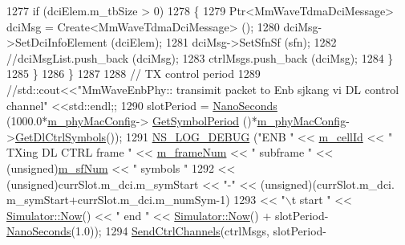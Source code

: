 \begin{DoxyCode}
1277                                 \textcolor{keywordflow}{if} (dciElem.m\_tbSize > 0)
1278                                 \{
1279                                         Ptr<MmWaveTdmaDciMessage> dciMsg = Create<MmWaveTdmaDciMessage> ();
1280                                         dciMsg->SetDciInfoElement (dciElem);
1281                                         dciMsg->SetSfnSf (sfn);
1282                                         \textcolor{comment}{//dciMsgList.push\_back (dciMsg);}
1283                                         ctrlMsgs.push\_back (dciMsg);
1284                                 \}
1285                         \}
1286                 \}
1287 
1288                 \textcolor{comment}{// TX control period}
1289                 \textcolor{comment}{//std::cout<<"MmWaveEnbPhy:: transimit packet to Enb sjkang vi DL control channel"
       <<std::endl;;}
1290                 slotPeriod = \hyperlink{group__timecivil_ga281d64bcb4dad96267d83c7688ec433f}{NanoSeconds} (1000.0*\hyperlink{classns3_1_1MmWavePhy_a869abf36bbdbb94eed77ba6e4846f6e4}{m\_phyMacConfig}->
      \hyperlink{classns3_1_1MmWavePhyMacCommon_a1048fa4a24a72abc5d4d982efd6c21af}{GetSymbolPeriod} ()*\hyperlink{classns3_1_1MmWavePhy_a869abf36bbdbb94eed77ba6e4846f6e4}{m\_phyMacConfig}->\hyperlink{classns3_1_1MmWavePhyMacCommon_a1be2da684374de93d7f501aab2441b5a}{GetDlCtrlSymbols}());
1291                 \hyperlink{group__logging_ga413f1886406d49f59a6a0a89b77b4d0a}{NS\_LOG\_DEBUG} (\textcolor{stringliteral}{"ENB "} << \hyperlink{classns3_1_1MmWavePhy_a0594531da45f93220d4f5de292bae823}{m\_cellId} << \textcolor{stringliteral}{" TXing DL CTRL frame "} << 
      \hyperlink{classns3_1_1MmWavePhy_a852ce585035a1c12122d2775e64ff38a}{m\_frameNum} << \textcolor{stringliteral}{" subframe "} << (\textcolor{keywordtype}{unsigned})\hyperlink{classns3_1_1MmWavePhy_af3d76eb9f3e5e1ff669852d05986c1a3}{m\_sfNum} << \textcolor{stringliteral}{" symbols "}
1292                               << (\textcolor{keywordtype}{unsigned})currSlot.m\_dci.m\_symStart << \textcolor{stringliteral}{"-"} << (\textcolor{keywordtype}{unsigned})(currSlot.m\_dci.
      m\_symStart+currSlot.m\_dci.m\_numSym-1)
1293                               << \textcolor{stringliteral}{"\(\backslash\)t start "} << \hyperlink{classns3_1_1Simulator_ac3178fa975b419f7875e7105be122800}{Simulator::Now}() << \textcolor{stringliteral}{" end "} << 
      \hyperlink{classns3_1_1Simulator_ac3178fa975b419f7875e7105be122800}{Simulator::Now}() + slotPeriod-\hyperlink{group__timecivil_ga281d64bcb4dad96267d83c7688ec433f}{NanoSeconds}(1.0));
1294                 \hyperlink{classns3_1_1MmWaveEnbPhy_a1725bb913c4d82b765005106e47b85cf}{SendCtrlChannels}(ctrlMsgs, slotPeriod-

\end{DoxyCode}
